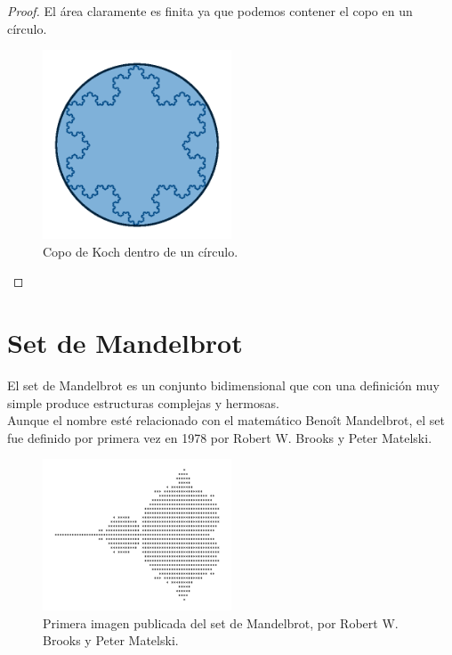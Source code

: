 \begin{proof}
    \noindent El área claramente es finita ya que podemos contener el copo en un círculo. \cite{youtube-2022}\\
    
    \begin{figure}[H]
        \centering
        \includegraphics[width=0.5\textwidth]{figures/koch-snowflake-circle.png}
        \caption{Copo de Koch dentro de un círculo.}
        \label{fig:koch-snowflake-circle}
    \end{figure}
\end{proof}

\section{Set de Mandelbrot}

\noindent El set de Mandelbrot es un conjunto bidimensional que con una definición muy simple produce estructuras complejas y hermosas.\\

\noindent Aunque el nombre esté relacionado con el matemático Benoît Mandelbrot, el set fue definido por primera vez en 1978 por Robert W. Brooks y Peter Matelski. \cite{Wikipedia_Mandelbrot}

\begin{figure}[H]
    \centering
    \includegraphics[width=0.5\textwidth]{figures/mandelbrot-set-first-picture.png}
    \caption{Primera imagen publicada del set de Mandelbrot, por Robert W. Brooks y Peter Matelski.}
    \label{fig:mandelbrot-set-first-picture}
\end{figure}

